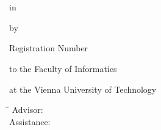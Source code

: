 \begin{center}
{\ \vspace{3.4cm}}

\begin{minipage}[t][2.8cm][s]{\textwidth}%
\centering
\thesistitlefontHUGE\sffamily\bfseries\tuinfthesistitle\\
\bigskip
{\thesistitlefonthuge\sffamily\bfseries\tuinfthesissubtitle}
\end{minipage}

\vspace{1.3cm}

{\thesistitlefontLARGE\sffamily \tuinfthesistypeen}

\vspace{6mm}


\vspace{6mm}

{\thesistitlefontLARGE\sffamily\bfseries \tuinfthesisdegreeen}

\vspace{6mm}

{\thesistitlefontlarge\sffamily in}

\vspace{6mm}

{\thesistitlefontLarge\sffamily\bfseries \tuinfthesiscurriculumen}

\vspace{6.5mm}

{\thesistitlefontlarge\sffamily by}

\vspace{6mm}

{\thesistitlefontLarge\sffamily\bfseries \tuinfthesisauthor}

\vspace{1.5mm}

{\thesistitlefontlarge\sffamily Registration Number \tuinfthesismatrikelno} 

\vspace{1.4cm}

\begin{minipage}[t][1.6cm][t]{\textwidth}%
  \vspace{0pt}\raggedright\thesistitlefontnormalsize\sffamily
  to the Faculty of Informatics 

  at the Vienna University of Technology
\end{minipage}

\vspace{0pt}\raggedright\thesistitlefontnormalsize\sffamily
\begin{minipage}[t][4cm][t]{\textwidth}%
  \begin{tabbing}%
	    \hspace{19mm} \= \hspace{66mm} \kill
	    Advisor: \> \tuinfthesisbetreins\\
	    Assistance: \> \tuinfthesisbetrzwei\\
	                \> \tuinfthesisbetrdrei
     \end{tabbing}
\end{minipage}


\end{center}

